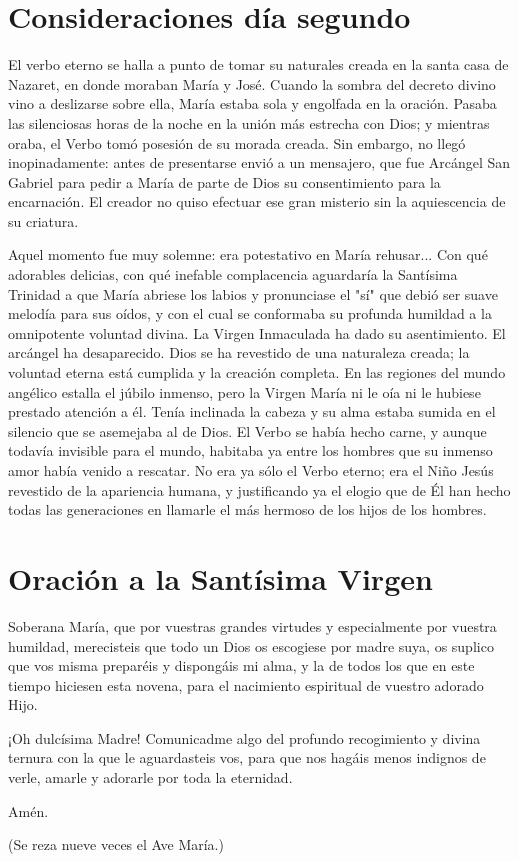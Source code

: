 \documentclass[spanish,utf8,12pt]{chlart}
\newenvironment{lectura}{\begingroup\color{lector}}{\endgroup\par}
\newenvironment{finalnotes}{\begingroup
	\footnotesize\sffamily\color{Gray}%
	\setlength{\leftskip}{3em}\setlength{\rightskip}{3em}\noindent
	}{\par\endgroup}
\begin{document}
\section{Consideraciones día segundo}
\begin{lectura}
El verbo eterno se halla a punto de tomar su naturales creada en la
santa casa de Nazaret, en donde moraban María y José.
Cuando la sombra del decreto divino vino a deslizarse sobre ella, María
estaba sola y engolfada en la oración.
Pasaba las silenciosas horas de la noche en la unión más estrecha con
Dios; y mientras oraba, el Verbo tomó posesión de su morada creada.
Sin embargo, no llegó inopinadamente:
antes de presentarse envió a un mensajero, que fue Arcángel San Gabriel
para pedir a María de parte de Dios su consentimiento para la encarnación.
El creador no quiso efectuar ese gran misterio sin la aquiescencia de su
criatura.

Aquel momento fue muy solemne:
era potestativo en María rehusar...
Con qué adorables delicias, con qué inefable complacencia aguardaría la
Santísima Trinidad a que María abriese los labios y pronunciase el "sí"
que debió ser suave melodía para sus oídos, y con el cual se conformaba
su profunda humildad a la omnipotente voluntad divina.
La Virgen Inmaculada ha dado su asentimiento.
El arcángel ha desaparecido.
Dios se ha revestido de una naturaleza creada; la voluntad eterna está
cumplida y la creación completa.
En las regiones del mundo angélico estalla el júbilo inmenso, pero la
Virgen María ni le oía ni le hubiese prestado atención a él.
Tenía inclinada la cabeza y su alma estaba sumida en el silencio que se
asemejaba al de Dios.
El Verbo se había hecho carne, y aunque todavía invisible para el mundo,
habitaba ya entre los hombres que su inmenso amor había venido a
rescatar.
No era ya sólo el Verbo eterno; era el Niño Jesús revestido de la
apariencia humana, y justificando ya el elogio que de Él han hecho todas
las generaciones en llamarle el más hermoso de los hijos de los hombres.
\end{lectura}

\section{Oración a la Santísima Virgen}
\begin{lectura}
Soberana María, que por vuestras grandes virtudes y especialmente por
vuestra humildad, merecisteis que todo un Dios os escogiese por madre
suya, os suplico que vos misma preparéis y dispongáis mi alma, y la de
todos los que en este tiempo hiciesen esta novena, para el nacimiento
espiritual de vuestro adorado Hijo.

¡Oh dulcísima Madre!
Comunicadme algo del profundo recogimiento y divina ternura con la que
le aguardasteis vos, para que nos hagáis menos indignos de verle, amarle
y adorarle por toda la eternidad.

Amén.
\end{lectura}
\begin{finalnotes}
(Se reza nueve veces el Ave María.)
\end{finalnotes}
\end{document}
